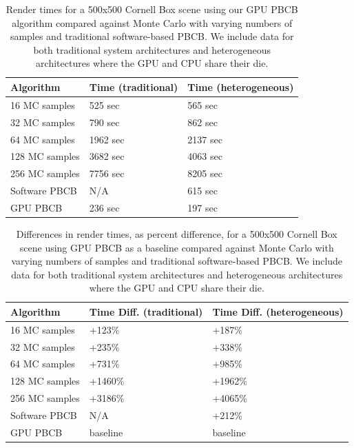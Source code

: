 \begin{table}[h!]
   \centering
   \begin{tabular}{ | l | l | l | }
   \hline
   \textbf{Algorithm} & \textbf{Time (traditional)} & \textbf{Time (heterogeneous)} \\ \hline
   16 MC samples & 525 sec & 565 sec \\ \hline
   32 MC samples & 790 sec & 862 sec \\ \hline
   64 MC samples & 1962 sec & 2137 sec \\ \hline
   128 MC samples & 3682 sec & 4063 sec \\ \hline
   256 MC samples & 7756 sec & 8205 sec \\ \hline
   Software PBCB & N/A & 615 sec \\ \hline
   GPU PBCB & 236 sec & 197 sec \\ \hline
   \end{tabular}
   \captionfonts
   \caption[Render times]{Render times for a 500x500 Cornell Box scene using our GPU PBCB algorithm compared against Monte Carlo with varying numbers of samples and traditional software-based PBCB. We include data for both traditional system architectures and heterogeneous architectures where the GPU and CPU share their die.}
   \label{tbl:renders}
\end{table}

\begin{table}[h!]
   \centering
   \begin{tabular}{ | l | l | l | }
   \hline
   \textbf{Algorithm} & \textbf{Time Diff. (traditional)} & \textbf{Time Diff. (heterogeneous)} \\ \hline
   16 MC samples & +123\% & +187\% \\ \hline
   32 MC samples & +235\% & +338\% \\ \hline
   64 MC samples & +731\% & +985\% \\ \hline
   128 MC samples & +1460\% & +1962\% \\ \hline
   256 MC samples & +3186\% & +4065\% \\ \hline
   Software PBCB & N/A & +212\% \\ \hline
   GPU PBCB & baseline & baseline \\ \hline
   \end{tabular}
   \captionfonts
   \caption[Render times speedup]{Differences in render times, as percent difference, for a 500x500 Cornell Box scene using GPU PBCB as a baseline compared against Monte Carlo with varying numbers of samples and traditional software-based PBCB. We include data for both traditional system architectures and heterogeneous architectures where the GPU and CPU share their die.}
   \label{tbl:render_diffs}
\end{table}

